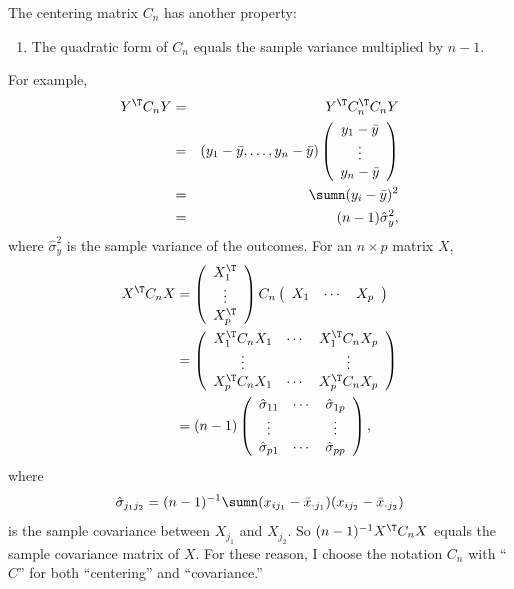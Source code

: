 The centering matrix $C_{n}$ has another property: 
\begin{enumerate}[label=(P\arabic*), ref=P\arabic*, start = 3]
\item
The quadratic
form of $C_{n}$ equals the sample variance multiplied by $n-1$. 
\end{enumerate}
For example,
\begin{eqnarray*}
Y^{\T}C_{n}Y&=&Y^{\T} C_{n}^{\T} C_{n}Y \\
&=& (y_{1}-\bar{y},\ldots, y_{n}-\bar{y})  \left(\begin{array}{c}
y_{1}-\bar{y}\\
\vdots\\
y_{n}-\bar{y}
\end{array}\right) \\
&=& \sumn(y_{i}-\bar{y})^{2} \\
&=& (n-1) \hat{\sigma}^2_y,
\end{eqnarray*}
where $ \hat{\sigma}^2_y $ is the sample variance of the outcomes. 
For an $n\times p$ matrix $X$, 
\begin{align*}
X^{\T}C_{n}X 
 & =\left(\begin{array}{c}
X_{1}^{\T}\\
\vdots\\
X_{p}^{\T}
\end{array}\right) C_{n}  \left(\begin{array}{ccc}
X_{1} & \cdots & X_{p}\end{array}\right)\\
&= \left(\begin{array}{ccc}
X_1^{\T} C_n X_1 & \cdots & X_1^{\T} C_n X_p \\
\vdots &  & \vdots\\
X_p^{\T} C_n X_1  & \cdots & X_p^{\T} C_n X_p 
\end{array}\right) \\ 
 & =(n-1)\left(\begin{array}{ccc}
\hat{\sigma}_{11} & \cdots & \hat{\sigma}_{1p}\\
\vdots &  & \vdots\\
\hat{\sigma}_{p1} & \cdots & \hat{\sigma}_{pp}
\end{array}\right),
\end{align*}
where 
$$
\hat{\sigma}_{j_{1}j_{2}}=(n-1)^{-1}\sumn(x_{ij_{1}}-\bar{x}_{\cdot j_{1}})(x_{ij_{2}}-\bar{x}_{\cdot j_{2}})
$$
is the sample covariance between $X_{j_{1}}$ and $X_{j_{2}}$. 
So $(n-1)^{-1} X^{\T} C_n X$ equals the sample covariance matrix of $X$. 
For these reason, I choose the notation $C_n$ with ``$C$'' for both ``centering'' and ``covariance.'' 


